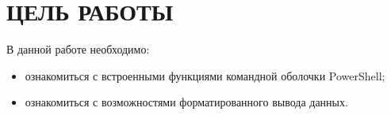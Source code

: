 \section{ЦЕЛЬ РАБОТЫ}

В данной работе необходимо:

\begin{itemize}
  \item ознакомиться с встроенными функциями командной оболочки PowerShell;
  \item ознакомиться с возможностями форматированного вывода данных.
\end{itemize}

\newpage
